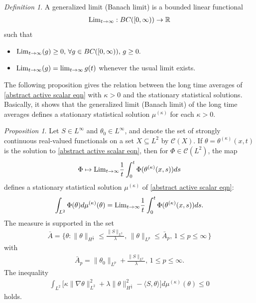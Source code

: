\documentclass[reqno]{amsart}%
\theoremstyle{definition}
\theoremstyle{remark}
\numberwithin{equation}{section}
\newtheorem{definition}[theorem]{Definition}
\newtheorem{proposition}[theorem]{Proposition}
\newcommand{\1}{\mathbf{1}}
\newcommand{\R}{\mathbb R}
\numberwithin{equation}{section}
\numberwithin{theorem}{section}
\numberwithin{figure}{section}
\begin{document}
\begin{definition}
A generalized limit (Banach limit) is a bounded linear functional
\begin{align*}
{\rm Lim}_{t\to\infty}:BC([0,\infty))\to\R
\end{align*}
such that
\begin{itemize}
\item ${\rm Lim}_{t\to\infty}(g)\ge0,\,\forall g\in BC([0,\infty)),\, g\ge0.$
\item ${\rm Lim}_{t\to\infty}(g)=\lim_{t\to\infty}g(t)$ whenever the usual limit exists.
\end{itemize}
\end{definition}
The following proposition gives the relation between the long time averages of \eqref{abstract active scalar eqn} with $\kappa>0$ and the stationary statistical solutions. Basically, it shows that the generalized limit (Banach limit) of the long time averages defines a stationary statistical solution $\mu^{(\kappa)}$ for each $\kappa>0$.
\begin{proposition}\label{long time average as ss kappa>0 prop}
Let $S\in L^\infty$ and $\theta_0\in L^\infty$, and denote the set of strongly continuous real-valued functionals on a set $X\subseteq L^2$ by $\mathcal{C}(X)$. If $\theta=\theta^{(\kappa)}(x,t)$ is the solution to \eqref{abstract active scalar eqn}, then for $\Phi\in\mathcal{C}(L^2)$, the map
\begin{align}\label{realisation map on solution kappa>0}
\Phi\mapsto{\rm Lim}_{t\to\infty}\frac{1}{t}\int_{0}^{t}\Phi(\theta^{(\kappa)}(x,s))ds
\end{align}
defines a stationary statistical solution $\mu^{(\kappa)}$ of \eqref{abstract active scalar eqn}:
\begin{align}\label{representation of theta as measure kappa>0}
\int_{L^2}\Phi(\theta)d\mu^{(\kappa)}(\theta)={\rm Lim}_{t\to\infty}\frac{1}{t}\int_{0}^{t}\Phi(\theta^{(\kappa)}(x,s))ds.
\end{align}
The measure is supported in the set
\begin{align*}
\bar{A}=\Big\{\theta:\|\theta\|_{H^\frac{1}{2}}\le\frac{\|S\|_{L^2}}{\lambda},\,\|\theta\|_{L^p}\le \bar{A}_p,\,1\le p\le \infty\,\Big\}
\end{align*}
with
\begin{align*}
\bar{A}_p=\|\theta_0\|_{L^p}+\frac{\|S\|_{L^p}}{\lambda},\,1\le p\le\infty.
\end{align*}
The inequality 
\begin{align}\label{inequality on nabla theta measure mu kappa>0}
\int_{L^2}\Big[\kappa\|\nabla\theta\|_{L^2}^2+\lambda\|\theta\|_{H^\frac{1}{2}}^2-\langle S,\theta\rangle\Big]d\mu^{(\kappa)}(\theta)\le0
\end{align}
holds.
\end{proposition}
\end{document}
